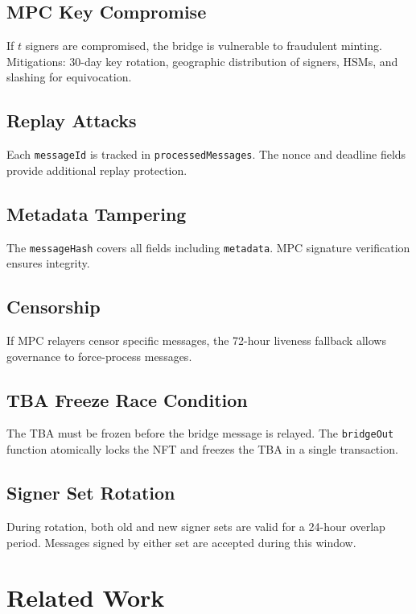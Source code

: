 \documentclass[11pt,letterpaper]{article}
\begin{document}
\subsection{MPC Key Compromise}

If $t$ signers are compromised, the bridge is vulnerable to fraudulent minting. Mitigations: 30-day key rotation, geographic distribution of signers, HSMs, and slashing for equivocation.

\subsection{Replay Attacks}

Each \texttt{messageId} is tracked in \texttt{processedMessages}. The nonce and deadline fields provide additional replay protection.

\subsection{Metadata Tampering}

The \texttt{messageHash} covers all fields including \texttt{metadata}. MPC signature verification ensures integrity.

\subsection{Censorship}

If MPC relayers censor specific messages, the 72-hour liveness fallback allows governance to force-process messages.

\subsection{TBA Freeze Race Condition}

The TBA must be frozen before the bridge message is relayed. The \texttt{bridgeOut} function atomically locks the NFT and freezes the TBA in a single transaction.

\subsection{Signer Set Rotation}

During rotation, both old and new signer sets are valid for a 24-hour overlap period. Messages signed by either set are accepted during this window.

\section{Related Work}
\end{document}
